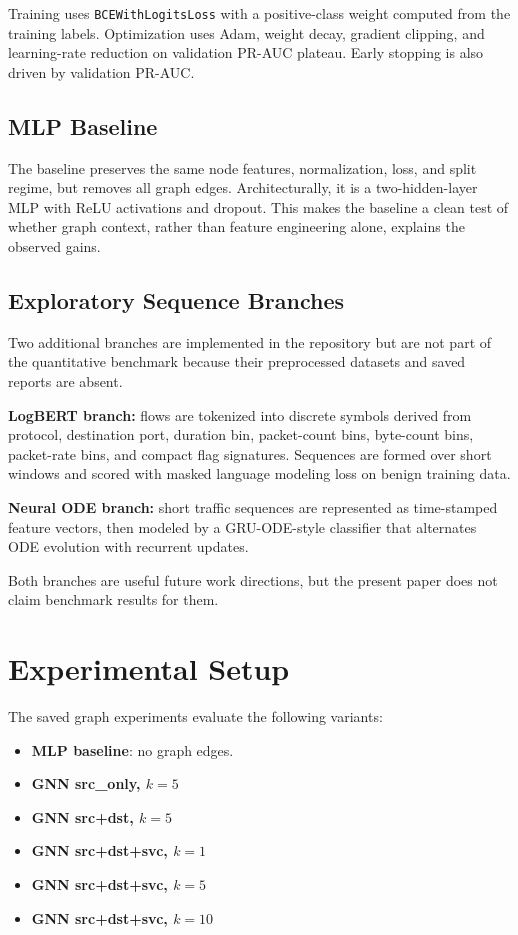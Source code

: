 \documentclass[conference]{IEEEtran}
\begin{document}
Training uses \texttt{BCEWithLogitsLoss} with a positive-class weight computed from the training labels. Optimization uses Adam, weight decay, gradient clipping, and learning-rate reduction on validation PR-AUC plateau. Early stopping is also driven by validation PR-AUC.

\subsection{MLP Baseline}
The baseline preserves the same node features, normalization, loss, and split regime, but removes all graph edges. Architecturally, it is a two-hidden-layer MLP with ReLU activations and dropout. This makes the baseline a clean test of whether graph context, rather than feature engineering alone, explains the observed gains.

\subsection{Exploratory Sequence Branches}
Two additional branches are implemented in the repository but are not part of the quantitative benchmark because their preprocessed datasets and saved reports are absent.

\textbf{LogBERT branch:} flows are tokenized into discrete symbols derived from protocol, destination port, duration bin, packet-count bins, byte-count bins, packet-rate bins, and compact flag signatures. Sequences are formed over short windows and scored with masked language modeling loss on benign training data.

\textbf{Neural ODE branch:} short traffic sequences are represented as time-stamped feature vectors, then modeled by a GRU-ODE-style classifier that alternates ODE evolution with recurrent updates.

Both branches are useful future work directions, but the present paper does not claim benchmark results for them.

\section{Experimental Setup}
The saved graph experiments evaluate the following variants:
\begin{itemize}
\item \textbf{MLP baseline}: no graph edges.
\item \textbf{GNN src\_only, $k=5$}
\item \textbf{GNN src+dst, $k=5$}
\item \textbf{GNN src+dst+svc, $k=1$}
\item \textbf{GNN src+dst+svc, $k=5$}
\item \textbf{GNN src+dst+svc, $k=10$}
\end{itemize}
\end{document}
